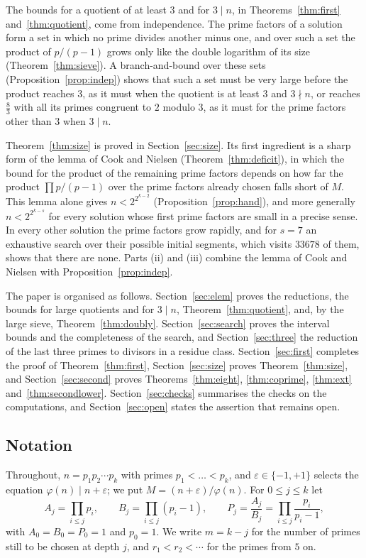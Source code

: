 \documentclass[11pt,reqno]{amsart}
\numberwithin{equation}{section}
\theoremstyle{plain}
\theoremstyle{definition}
\theoremstyle{remark}
\begin{document}
The bounds for a quotient of at least $3$ and for $3\mid n$, in
Theorems~\ref{thm:first} and~\ref{thm:quotient}, come from
independence. The prime factors of a solution form a set in which no
prime divides another minus one, and over such a set the product of
$p/(p-1)$ grows only like the double logarithm of its size
(Theorem~\ref{thm:sieve}). A branch-and-bound over these sets
(Proposition~\ref{prop:indep}) shows that such a set must be very large
before the product reaches $3$, as it must when the quotient is at
least $3$ and $3\nmid n$, or reaches $\frac83$ with all its primes
congruent to $2$ modulo $3$, as it must for the prime factors other
than $3$ when $3\mid n$.

Theorem~\ref{thm:size} is proved in Section~\ref{sec:size}. Its first
ingredient is a sharp form of the lemma of Cook and Nielsen
(Theorem~\ref{thm:deficit}), in which the bound for the product of the
remaining prime factors depends on how far the product
$\prod p/(p-1)$ over the prime factors already chosen falls short of
$M$. This lemma alone gives $n<2^{2^{k-2}}$
(Proposition~\ref{prop:hand}), and more generally $n<2^{2^{k-s}}$ for
every solution whose first prime factors are small in a precise sense.
In every other solution the prime factors grow rapidly, and for $s=7$
an exhaustive search over their possible initial segments, which visits
$33678$ of them, shows that there are none. Parts (ii) and (iii)
combine the lemma of Cook and Nielsen with Proposition~\ref{prop:indep}.

The paper is organised as follows. Section~\ref{sec:elem} proves the
reductions, the bounds for large quotients and for $3\mid n$,
Theorem~\ref{thm:quotient}, and, by the large sieve,
Theorem~\ref{thm:doubly}. Section~\ref{sec:search} proves the interval
bounds and the completeness of the search, and
Section~\ref{sec:three} the reduction of the last three primes to
divisors in a residue class. Section~\ref{sec:first} completes the
proof of Theorem~\ref{thm:first}, Section~\ref{sec:size} proves
Theorem~\ref{thm:size}, and Section~\ref{sec:second} proves
Theorems~\ref{thm:eight}, \ref{thm:coprime}, \ref{thm:ext}
and~\ref{thm:secondlower}.
Section~\ref{sec:checks} summarises the checks on the computations,
and Section~\ref{sec:open} states the assertion that remains open.

\subsection*{Notation}
Throughout, $n=p_1p_2\cdots p_k$ with primes $p_1<\dots<p_k$, and
$\varepsilon\in\{-1,+1\}$ selects the equation
$\varphi(n)\mid n+\varepsilon$; we put $M=(n+\varepsilon)/\varphi(n)$.
For $0\le j\le k$ let
\[
  A_j=\prod_{i\le j}p_i,\qquad B_j=\prod_{i\le j}(p_i-1),\qquad
  P_j=\frac{A_j}{B_j}=\prod_{i\le j}\frac{p_i}{p_i-1},
\]
with $A_0=B_0=P_0=1$ and $p_0=1$. We write $m=k-j$ for the number of
primes still to be chosen at depth $j$, and
$r_1<r_2<\cdots$ for the primes from $5$ on.
\end{document}
